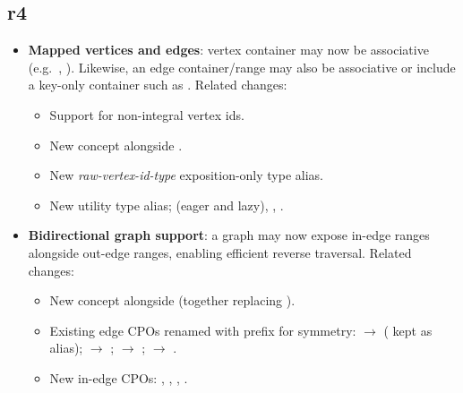 \subsection*{\paperno r4}

\begin{itemize}
      \item \textbf{Mapped vertices and edges}: vertex container may now be associative (e.g.\ , 
            ). Likewise, an edge container/range may also be associative or include a 
            key-only container such as . Related changes:
            \begin{itemize}
                  \item Support for non-integral vertex ids.
                  \item New concept  alongside .
                  \item New \textit{raw-vertex-id-type} exposition-only type alias.
                  \item New  utility type alias;
                         (eager and lazy),
                        , .
            \end{itemize}
      \item \textbf{Bidirectional graph support}: a graph may now expose in-edge ranges
            alongside out-edge ranges, enabling efficient reverse traversal.  Related changes:
            \begin{itemize}
                  \item New concept  alongside 
                        (together replacing ).
                  \item Existing edge CPOs renamed with  prefix for symmetry:
                         $\rightarrow$  ( kept as alias);
                         $\rightarrow$ ;
                         $\rightarrow$ ;
                         $\rightarrow$ .
                  \item New in-edge CPOs: , ,
                        , .

\end{itemize}
\end{itemize}
